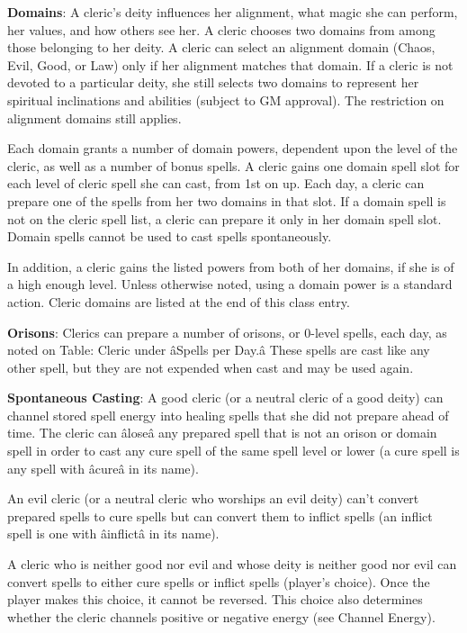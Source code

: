 \textbf{Domains}: A cleric's deity influences her alignment, what magic she can perform, her values, and how 
others see her. A cleric chooses two domains from among those belonging to her deity. A cleric can select an 
alignment domain (Chaos, Evil, Good, or Law) only if her alignment matches that domain. If a cleric is not 
devoted to a particular deity, she still selects two domains to represent her spiritual inclinations and 
abilities (subject to GM approval). The restriction on alignment domains still applies.

Each domain grants a number of domain powers, dependent upon the level of the cleric, as well as a number of 
bonus spells. A cleric gains one domain spell slot for each level of cleric spell she can cast, from 1st on up. 
Each day, a cleric can prepare one of the spells from her two domains in that slot. If a domain spell is not on
the cleric spell list, a cleric can prepare it only in her domain spell slot. Domain spells cannot be used to 
cast spells spontaneously. 

In addition, a cleric gains the listed powers from both of her domains, if she is of a high enough level. Unless
otherwise noted, using a domain power is a standard action. Cleric domains are listed at the end of this class
entry.
				
\textbf{Orisons}: Clerics can prepare a number of orisons, or 0-level spells, each day, as noted on Table: Cleric under \^aSpells per Day.\^a These spells are cast like any other spell, but they are not expended when cast and may be used again.
				
\textbf{Spontaneous Casting}: A good cleric (or a neutral cleric of a good deity) can channel stored spell energy into healing spells that she did not prepare ahead of time. The cleric can \^alose\^a any prepared spell that is not an orison or domain spell in order to cast any cure spell of the same spell level or lower (a cure spell is any spell with \^acure\^a in its name). 
				
An evil cleric (or a neutral cleric who worships an evil deity) can't convert prepared spells to cure spells but can convert them to inflict spells (an inflict spell is one with \^ainflict\^a in its name).
				
A cleric who is neither good nor evil and whose deity is neither good nor evil can convert spells to either cure spells or inflict spells (player's choice). Once the player makes this choice, it cannot be reversed. This choice also determines whether the cleric channels positive or negative energy (see Channel Energy).
				
